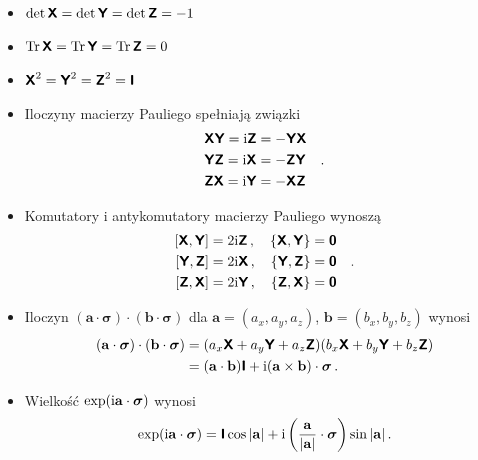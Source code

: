 \documentclass{myclass}
\begin{document}
\begin{itemize}
    
    \item \(\det\boldsymbol{\mathsf{X}} = \det\boldsymbol{\mathsf{Y}} = \det\boldsymbol{\mathsf{Z}} = -1\)

    \item \(\Tr\boldsymbol{\mathsf{X}} = \Tr\boldsymbol{\mathsf{Y}} = \Tr\boldsymbol{\mathsf{Z}} = 0\)

    \item \(\boldsymbol{\mathsf{X}}^2 = \boldsymbol{\mathsf{Y}}^2 = \boldsymbol{\mathsf{Z}}^2 = \boldsymbol{\mathsf{I}}\)

    \item Iloczyny macierzy Pauliego spełniają związki
    \begin{equation*}
        \begin{split}
            &\boldsymbol{\mathsf{X}}\boldsymbol{\mathsf{Y}} = \mathrm{i}\boldsymbol{\mathsf{Z}} = -\boldsymbol{\mathsf{Y}}\boldsymbol{\mathsf{X}} \\
            &\boldsymbol{\mathsf{Y}}\boldsymbol{\mathsf{Z}} = \mathrm{i}\boldsymbol{\mathsf{X}} = -\boldsymbol{\mathsf{Z}}\boldsymbol{\mathsf{Y}} \\
            &\boldsymbol{\mathsf{Z}}\boldsymbol{\mathsf{X}} = \mathrm{i}\boldsymbol{\mathsf{Y}} = -\boldsymbol{\mathsf{X}}\boldsymbol{\mathsf{Z}}
        \end{split}\quad.
    \end{equation*}

    \item Komutatory i antykomutatory macierzy Pauliego wynoszą
    \begin{equation*}
        \begin{split}
            [\oper{X},\oper{Y}] = 2\im\oper{Z}\,,\quad \{\oper{X}, \oper{Y}\} = \oper{\mathsf{0}}\\
            [\oper{Y},\oper{Z}] = 2\im\oper{X}\,,\quad \{\oper{Y}, \oper{Z}\} = \oper{\mathsf{0}}\\
            [\oper{Z},\oper{X}] = 2\im\oper{Y}\,,\quad \{\oper{Z}, \oper{X}\} = \oper{\mathsf{0}}\\
        \end{split}\quad.
    \end{equation*}

    \item Iloczyn \((\mathbf{a}\cdot\boldsymbol{\sigma})\cdot(\mathbf{b}\cdot\boldsymbol{\sigma})\)
    dla \(\mathbf{a} = (a_x,a_y,a_z)\), \(\mathbf{b}=(b_x,b_y,b_z)\) wynosi
    \begin{equation*}
        \begin{split}
            (\mathbf{a}\cdot\boldsymbol{\sigma})\cdot(\mathbf{b}\cdot\boldsymbol{\sigma}) &= (a_x\boldsymbol{\mathsf{X}} + a_y\boldsymbol{\mathsf{Y}} + a_z\boldsymbol{\mathsf{Z}})(b_x\boldsymbol{\mathsf{X}} + b_y\boldsymbol{\mathsf{Y}} + b_z\boldsymbol{\mathsf{Z}})\\
            &= (\mathbf{a}\cdot\mathbf{b})\boldsymbol{\mathsf{I}} + \mathrm{i}(\mathbf{a}\times\mathbf{b})\cdot\boldsymbol{\sigma}\,.
        \end{split}
    \end{equation*}

    \item Wielkość \(\exp(\mathrm{i}\mathbf{a}\cdot\boldsymbol{\sigma})\) wynosi
    \begin{equation*}
            \exp(\mathrm{i}\mathbf{a}\cdot\boldsymbol{\sigma}) = \boldsymbol{\mathsf{I}} \cos{|\mathbf{a}|} + \mathrm{i}\left(\frac{\mathbf{a}}{|\mathbf{a}|}\cdot\boldsymbol{\sigma}\right)\sin{|\mathbf{a}|}\,.
    \end{equation*}

\end{itemize}
\end{document}
